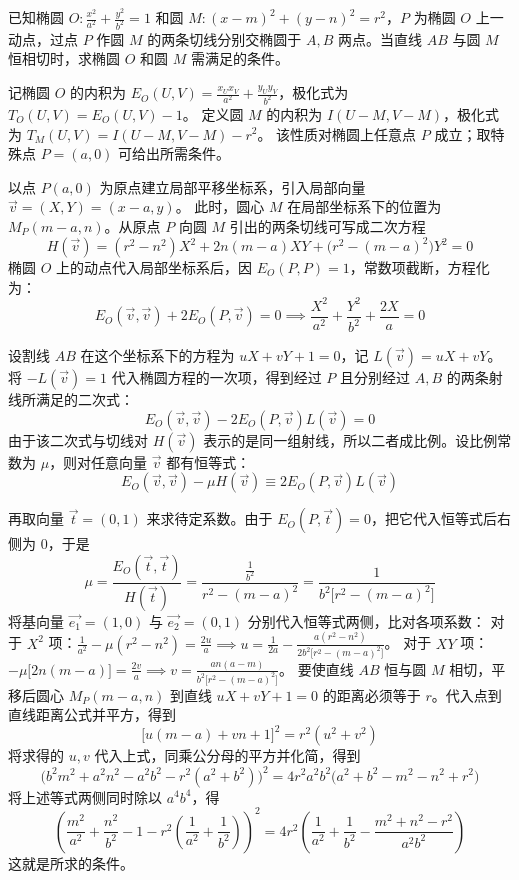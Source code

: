 \begin{exercise}
已知椭圆 \(O: \frac{x^2}{a^2} + \frac{y^2}{b^2} = 1\) 和圆 \(M: (x - m)^2 + (y - n)^2 = r^2\)，\(P\) 为椭圆 \(O\) 上一动点，过点 \(P\) 作圆 \(M\) 的两条切线分别交椭圆于 \(A, B\) 两点。当直线 \(AB\) 与圆 \(M\) 恒相切时，求椭圆 \(O\) 和圆 \(M\) 需满足的条件。
\end{exercise}
\begin{solution}
记椭圆 $O$ 的内积为 $E_O(U,V) = \frac{x_U x_V}{a^2} + \frac{y_U y_V}{b^2}$，极化式为 $T_O(U,V) = E_O(U,V) - 1$。
定义圆 $M$ 的内积为 $I(U-M, V-M)$，极化式为 $T_M(U,V) = I(U-M, V-M) - r^2$。
该性质对椭圆上任意点 $P$ 成立；取特殊点 $P=(a,0)$ 可给出所需条件。

以点 $P(a,0)$ 为原点建立局部平移坐标系，引入局部向量 $\vec{v} = (X, Y) = (x-a, y)$。
此时，圆心 $M$ 在局部坐标系下的位置为 $M_P(m-a, n)$。从原点 $P$ 向圆 $M$ 引出的两条切线可写成二次方程
$$ H(\vec{v}) = (r^2 - n^2)X^2 + 2n(m-a)XY + \big(r^2 - (m-a)^2\big)Y^2 = 0 $$
椭圆 $O$ 上的动点代入局部坐标系后，因 $E_O(P,P) = 1$，常数项截断，方程化为：
$$ E_O(\vec{v}, \vec{v}) + 2E_O(P, \vec{v}) = 0 \implies \frac{X^2}{a^2} + \frac{Y^2}{b^2} + \frac{2X}{a} = 0 $$

设割线 $AB$ 在这个坐标系下的方程为 $uX + vY + 1 = 0$，记 $L(\vec{v}) = uX + vY$。
将 $-L(\vec{v}) = 1$ 代入椭圆方程的一次项，得到经过 $P$ 且分别经过 $A,B$ 的两条射线所满足的二次式：
$$ E_O(\vec{v}, \vec{v}) - 2E_O(P, \vec{v})L(\vec{v}) = 0 $$
由于该二次式与切线对 $H(\vec{v})$ 表示的是同一组射线，所以二者成比例。设比例常数为 $\mu$，则对任意向量 $\vec{v}$ 都有恒等式：
$$ E_O(\vec{v}, \vec{v}) - \mu H(\vec{v}) \equiv 2E_O(P, \vec{v})L(\vec{v}) $$

再取向量 $\vec{t} = (0, 1)$ 来求待定系数。由于 $E_O(P, \vec{t}) = 0$，把它代入恒等式后右侧为 $0$，于是
$$ \mu = \frac{E_O(\vec{t}, \vec{t})}{H(\vec{t})} = \frac{\frac{1}{b^2}}{r^2 - (m-a)^2} = \frac{1}{b^2 \big[r^2 - (m-a)^2\big]} $$
将基向量 $\vec{e_1} = (1,0)$ 与 $\vec{e_2} = (0,1)$ 分别代入恒等式两侧，比对各项系数：
对于 $X^2$ 项：$\frac{1}{a^2} - \mu (r^2 - n^2) = \frac{2u}{a} \implies u = \frac{1}{2a} - \frac{a(r^2 - n^2)}{2b^2 \big[r^2 - (m-a)^2\big]}$。
对于 $XY$ 项：$-\mu \big[2n(m-a)\big] = \frac{2v}{a} \implies v = \frac{an(a-m)}{b^2 \big[r^2 - (m-a)^2\big]}$。
要使直线 $AB$ 恒与圆 $M$ 相切，平移后圆心 $M_P(m-a, n)$ 到直线 $uX + vY + 1 = 0$ 的距离必须等于 $r$。代入点到直线距离公式并平方，得到
$$ \big[u(m-a) + vn + 1\big]^2 = r^2(u^2 + v^2) $$
将求得的 $u, v$ 代入上式，同乘公分母的平方并化简，得到
$$ \big(b^2 m^2 + a^2 n^2 - a^2 b^2 - r^2(a^2+b^2)\big)^2 = 4r^2 a^2 b^2 \big(a^2+b^2 - m^2 - n^2 + r^2\big) $$
将上述等式两侧同时除以 $a^4 b^4$，得
$$ \left( \frac{m^2}{a^2} + \frac{n^2}{b^2} - 1 - r^2\left(\frac{1}{a^2} + \frac{1}{b^2}\right) \right)^2 = 4r^2 \left( \frac{1}{a^2} + \frac{1}{b^2} - \frac{m^2+n^2-r^2}{a^2 b^2} \right) $$
这就是所求的条件。
\end{solution}

